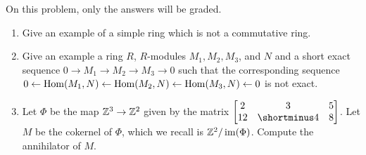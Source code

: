 \begin{question}[subtitle=January 2019 Problem 1,ID=Jan19_1]
On this problem, only the answers will be graded.
\begin{enumerate}
    \item Give an example of a simple ring which is not a commutative ring.
    \item Give an example a ring $R$, $R$-modules $M_1, M_2, M_3$, and $N$ and a short exact sequence $0\to M_1\to M_2 \to M_3 \to 0$  such that the corresponding sequence \newline$0\leftarrow \operatorname{Hom}(M_1, N)\leftarrow \operatorname{Hom}(M_2, N)\leftarrow \operatorname{Hom}(M_3, N)\leftarrow 0$ is not exact.
    \item Let $\Phi$ be the map $\mathbb{Z}^3\to \mathbb{Z}^2$ given by the matrix $\begin{bmatrix} 2 & 3 & 5\\ 12 & \shortminus 4 & 8 \end{bmatrix}$. Let $M$ be the cokernel of $\Phi$, which we recall is $\mathbb{Z}^2/\operatorname{im}(\Phi)$. Compute the annihilator of $M$.
\end{enumerate}
\end{question}
